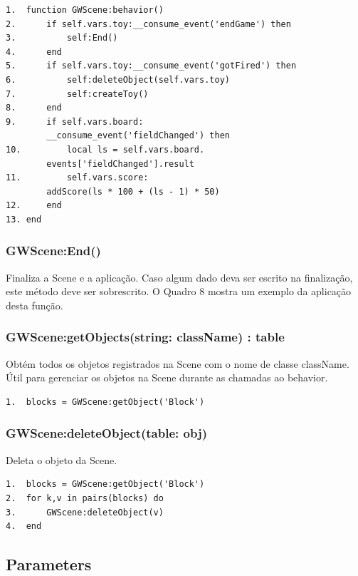 \documentclass[
	12pt,				%
	openright,			%
	oneside,			%
	a4paper,			%
	brazil,				%
	]{abntex2}
\begin{document}
\begin{lstlisting}[caption={Exemplo de uso da função behavior},label=cod_scene_2,frame=single]
1.	function GWScene:behavior()
2.		if self.vars.toy:__consume_event('endGame') then
3.			self:End()
4.		end
5.		if self.vars.toy:__consume_event('gotFired') then
6.			self:deleteObject(self.vars.toy)
7.			self:createToy()
8.		end
9.		if self.vars.board:
		__consume_event('fieldChanged') then
10.			local ls = self.vars.board.
		events['fieldChanged'].result
11.			self.vars.score:
		addScore(ls * 100 + (ls - 1) * 50)
12.		end
13.	end
\end{lstlisting}

\subsubsection{GWScene:End()}

Finaliza a Scene e a aplicação. Caso algum dado deva ser escrito na finalização, este método deve ser sobrescrito. O Quadro 8 mostra um exemplo da aplicação desta função.

\subsubsection{GWScene:getObjects(string: className) : table}

Obtém todos os objetos registrados na Scene com o nome de classe className. Útil para gerenciar os objetos na Scene durante as chamadas ao behavior.

\begin{lstlisting}[caption={Exemplo de uso da função getObjects},label=cod_scene_3,frame=single]
1.	blocks = GWScene:getObject('Block')
\end{lstlisting}

\subsubsection{GWScene:deleteObject(table: obj)}

Deleta o objeto da Scene.

\begin{lstlisting}[caption={Exemplo de uso da função deleteObject},label=cod_scene_4,frame=single]
1.	blocks = GWScene:getObject('Block')
2.	for k,v in pairs(blocks) do
3.		GWScene:deleteObject(v)
4.	end
\end{lstlisting}

\subsection{Parameters}
\end{document}
